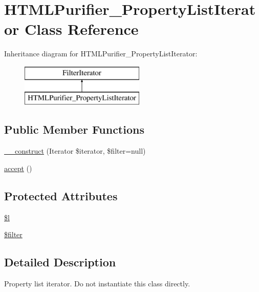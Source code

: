 \hypertarget{classHTMLPurifier__PropertyListIterator}{\section{H\+T\+M\+L\+Purifier\+\_\+\+Property\+List\+Iterator Class Reference}
\label{classHTMLPurifier__PropertyListIterator}
}
Inheritance diagram for H\+T\+M\+L\+Purifier\+\_\+\+Property\+List\+Iterator\+:\begin{figure}[H]
\begin{center}
\leavevmode
\includegraphics[height=2.000000cm]{classHTMLPurifier__PropertyListIterator}
\end{center}
\end{figure}
\subsection*{Public Member Functions}
\begin{DoxyCompactItemize}
\item 
\hyperlink{classHTMLPurifier__PropertyListIterator_a63a5e61b9f911ca712c0b41f296e1874}{\+\_\+\+\_\+construct} (Iterator \$iterator, \$filter=null)
\item 
\hyperlink{classHTMLPurifier__PropertyListIterator_a6ed4bebb9cd9983e90e9a728c08ea6ca}{accept} ()
\end{DoxyCompactItemize}
\subsection*{Protected Attributes}
\begin{DoxyCompactItemize}
\item 
\hyperlink{classHTMLPurifier__PropertyListIterator_a27292e22d81f619f1fc0396fd5445004}{\$l}
\item 
\hyperlink{classHTMLPurifier__PropertyListIterator_a149602e661a7924b45179aab9147f15c}{\$filter}
\end{DoxyCompactItemize}


\subsection{Detailed Description}
Property list iterator. Do not instantiate this class directly. 

